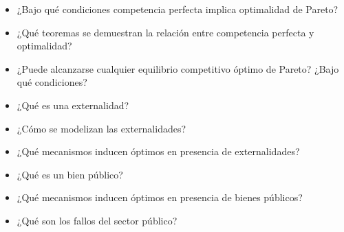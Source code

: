\documentclass{nuevotema}
\begin{document}
\begin{itemize}
	\item ¿Bajo qué condiciones competencia perfecta implica optimalidad de Pareto?
	\item ¿Qué teoremas se demuestran la relación entre competencia perfecta y optimalidad?
	\item ¿Puede alcanzarse cualquier equilibrio competitivo óptimo de Pareto? ¿Bajo qué condiciones?
	\item ¿Qué es una externalidad?
	\item ¿Cómo se modelizan las externalidades?
	\item ¿Qué mecanismos inducen óptimos en presencia de externalidades?
	\item ¿Qué es un bien público?
	\item ¿Qué mecanismos inducen óptimos en presencia de bienes públicos?
	\item ¿Qué son los fallos del sector público?
\end{itemize}

\esquemacorto
\end{document}
